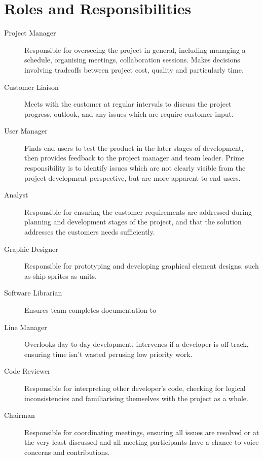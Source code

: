 \section{Roles and Responsibilities}
\begin{description}
\item[Project Manager] Responsible for overseeing the project in general, including managing a schedule, organising meetings, collaboration sessions. Makes decisions involving tradeoffs between project cost, quality and particularly time. 

\item[Customer Liaison] Meets with the customer at regular intervals to discuss the project progress, outlook, and any issues which are require customer input.

\item[User Manager] Finds end users to test the product in the later stages of development, then provides feedback to the project manager and team leader. Prime responsibility is to identify issues which are not clearly visible from the project development perspective, but are more apparent to end users.

\item[Analyst] Responsible for ensuring the customer requirements are addressed during planning and development stages of the project, and that the solution addresses the customers needs sufficiently.

\item[Graphic Designer] Responsible for prototyping and developing graphical element designs, such as ship sprites as units.

\item[Software Librarian] Ensures team completes documentation to

\item[Line Manager] Overlooks day to day development, intervenes if a developer is off track, ensuring time isn't wasted perusing low priority work.

\item[Code Reviewer] Responsible for interpreting other developer's code, checking for logical inconsistencies and familiarising themselves with the project as a whole.

\item[Chairman] Responsible for coordinating meetings, ensuring all issues are resolved or at the very least discussed and all meeting participants have a chance to voice concerns and contributions.


\end{description}
